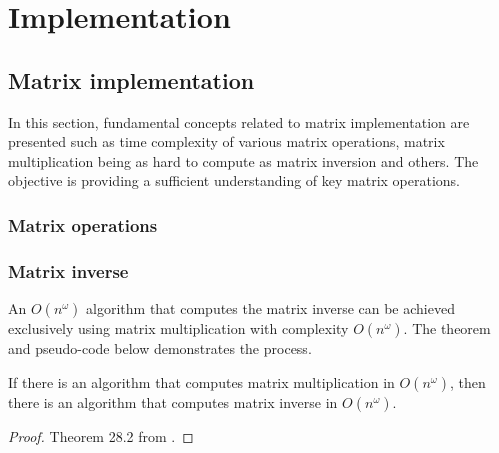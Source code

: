 \chapter{Implementation}
\label{chap:implementation}

\section{Matrix implementation}
\label{sec:matrix_impl}

In this section, fundamental concepts related to matrix implementation are presented such as time complexity of various matrix operations,
matrix multiplication being as hard to compute as matrix inversion and others.
The objective is providing a sufficient understanding of key matrix operations.

\subsection{Matrix operations}

\subsection{Matrix inverse}

An \(O(n^\omega)\) algorithm that computes the matrix inverse can be achieved exclusively using matrix multiplication with complexity \(O(n^\omega)\). 
The theorem and pseudo-code below demonstrates the process.

\begin{theorem}
    \label{thm:mult_inv}
    If there is an algorithm that computes matrix multiplication in \(O(n^{\omega})\), then
    there is an algorithm that computes matrix inverse in \(O(n^{\omega})\).
\end{theorem}

\begin{proof}
    Theorem 28.2 from \citet{CLRS}.
\end{proof}

